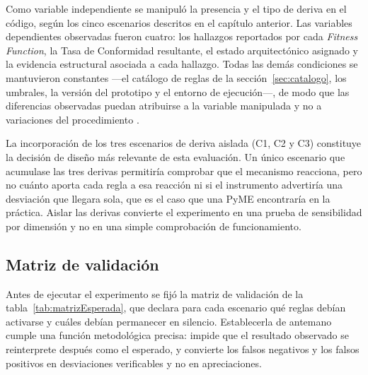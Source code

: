 Como variable independiente se manipuló la presencia y el tipo de deriva en el código, según los cinco escenarios descritos en el capítulo anterior. Las variables dependientes observadas fueron cuatro: los hallazgos reportados por cada \textit{Fitness Function}, la Tasa de Conformidad resultante, el estado arquitectónico asignado y la evidencia estructural asociada a cada hallazgo. Todas las demás condiciones se mantuvieron constantes ---el catálogo de reglas de la sección~\ref{sec:catalogo}, los umbrales, la versión del prototipo y el entorno de ejecución---, de modo que las diferencias observadas puedan atribuirse a la variable manipulada y no a variaciones del procedimiento \citep{Wohlin2012}.

La incorporación de los tres escenarios de deriva aislada (C1, C2 y C3) constituye la decisión de diseño más relevante de esta evaluación. Un único escenario que acumulase las tres derivas permitiría comprobar que el mecanismo reacciona, pero no cuánto aporta cada regla a esa reacción ni si el instrumento advertiría una desviación que llegara sola, que es el caso que una PyME encontraría en la práctica. Aislar las derivas convierte el experimento en una prueba de sensibilidad por dimensión y no en una simple comprobación de funcionamiento.

\subsection{Matriz de validación}
Antes de ejecutar el experimento se fijó la matriz de validación de la tabla~\ref{tab:matrizEsperada}, que declara para cada escenario qué reglas debían activarse y cuáles debían permanecer en silencio. Establecerla de antemano cumple una función metodológica precisa: impide que el resultado observado se reinterprete después como el esperado, y convierte los falsos negativos y los falsos positivos en desviaciones verificables y no en apreciaciones.

